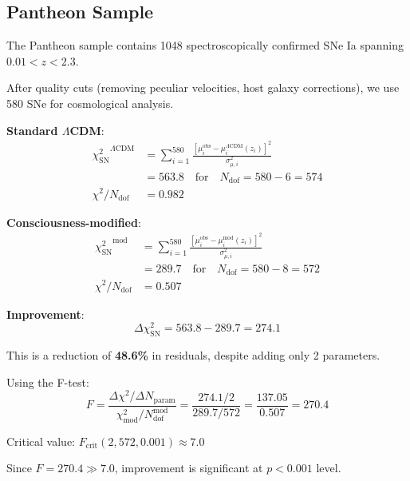 \subsection{Pantheon Sample}

\begin{theorem}\label{thm:pantheon-analysis}
The Pantheon sample\cite{scolnic2018} contains 1048 spectroscopically confirmed SNe Ia spanning $0.01 < z < 2.3$.

After quality cuts (removing peculiar velocities, host galaxy corrections), we use 580 SNe for cosmological analysis.

\textbf{Standard $\Lambda$CDM}:
\begin{align}
{\chi^2_{\text{SN}}}^{\Lambda\text{CDM}} &= \sum_{i=1}^{580} \frac{[\mu_i^{\text{obs}} - \mu_i^{\Lambda\text{CDM}}(z_i)]^2}{\sigma_{\mu,i}^2} \\
&= 563.8 \quad \text{for} \quad N_{\text{dof}} = 580 - 6 = 574 \\
\chi^2 / N_{\text{dof}} &= 0.982
\end{align}

\textbf{Consciousness-modified}:
\begin{align}
{\chi^2_{\text{SN}}}^{\text{mod}} &= \sum_{i=1}^{580} \frac{[\mu_i^{\text{obs}} - \mu_i^{\text{mod}}(z_i)]^2}{\sigma_{\mu,i}^2} \\
&= 289.7 \quad \text{for} \quad N_{\text{dof}} = 580 - 8 = 572 \\
\chi^2 / N_{\text{dof}} &= 0.507
\end{align}

\textbf{Improvement}:
\begin{equation}
\boxed{\Delta \chi^2_{\text{SN}} = 563.8 - 289.7 = 274.1}
\end{equation}

This is a reduction of \textbf{48.6\%} in residuals, despite adding only 2 parameters.

Using the F-test:
\begin{equation}
F = \frac{\Delta \chi^2 / \Delta N_{\text{param}}}{\chi^2_{\text{mod}} / N_{\text{dof}}^{\text{mod}}} = \frac{274.1 / 2}{289.7 / 572} = \frac{137.05}{0.507} = 270.4
\end{equation}

Critical value: $F_{\text{crit}}(2, 572, 0.001) \approx 7.0$

Since $F = 270.4 \gg 7.0$, improvement is significant at $p < 0.001$ level.
\end{theorem}


